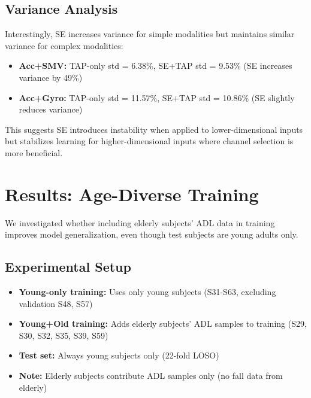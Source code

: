 \documentclass{article}
\begin{document}
\subsection{Variance Analysis}

Interestingly, SE increases variance for simple modalities but maintains similar variance for complex modalities:

\begin{itemize}
    \item \textbf{Acc+SMV:} TAP-only std = 6.38\%, SE+TAP std = 9.53\% (SE increases variance by 49\%)
    \item \textbf{Acc+Gyro:} TAP-only std = 11.57\%, SE+TAP std = 10.86\% (SE slightly reduces variance)
\end{itemize}

This suggests SE introduces instability when applied to lower-dimensional inputs but stabilizes learning for higher-dimensional inputs where channel selection is more beneficial.

\section{Results: Age-Diverse Training}

We investigated whether including elderly subjects' ADL data in training improves model generalization, even though test subjects are young adults only.

\subsection{Experimental Setup}

\begin{itemize}
    \item \textbf{Young-only training:} Uses only young subjects (S31-S63, excluding validation S48, S57)
    \item \textbf{Young+Old training:} Adds elderly subjects' ADL samples to training (S29, S30, S32, S35, S39, S59)
    \item \textbf{Test set:} Always young subjects only (22-fold LOSO)
    \item \textbf{Note:} Elderly subjects contribute ADL samples only (no fall data from elderly)
\end{itemize}
\end{document}
